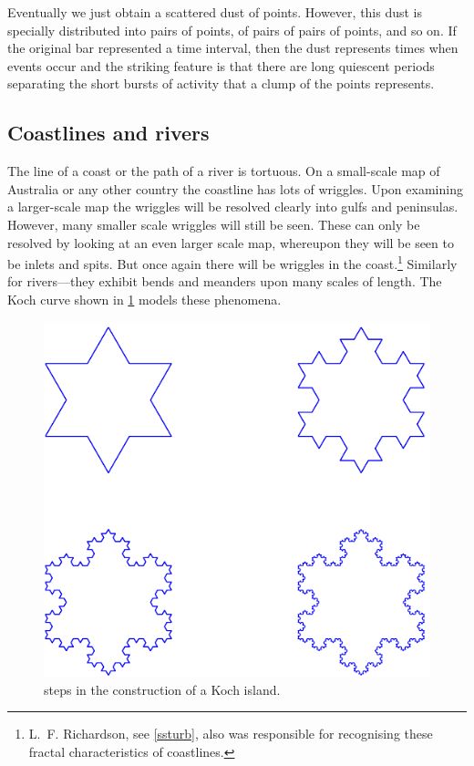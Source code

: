\documentclass[12pt]{article}
\begin{document}
Eventually we just 
obtain a scattered dust of points.  However, this dust is specially 
distributed into pairs of points, of pairs of pairs of points, and so 
on.  If the original bar represented a time interval, then the dust 
represents times when events occur and the striking feature is that 
there are long quiescent periods separating the short bursts of 
activity that a clump of the points represents.

\newpage

\subsection{Coastlines and rivers}
\label{sscoast}

The line of a coast or the path of a river is tortuous.  On a 
small-scale map of Australia or any other country the coastline has 
lots of wriggles.  Upon examining a larger-scale map the wriggles will 
be resolved clearly into gulfs and peninsulas.  However, many smaller 
scale wriggles will still be seen.  These can only be resolved by 
looking at an even larger scale map, whereupon they will be seen to be 
inlets and spits.  But once again there will be wriggles in the 
coast.\footnote{L.~F. Richardson, see \cref{ssturb}, also was 
responsible for recognising these fractal characteristics of 
coastlines.} Similarly for rivers---they exhibit bends and meanders 
upon many scales of length.  The Koch curve shown in 
\cref{F:koch} models these phenomena.



\begin{figure}
	\centerline{\includegraphics[height=0.8\textheight]{koch}}
	\caption{steps in the construction of a Koch island.}
	\label{F:koch}
\end{figure}
\end{document}
